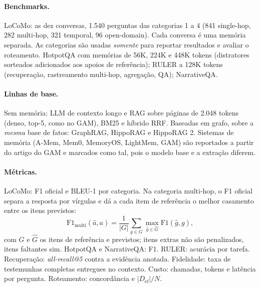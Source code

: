 \documentclass[11pt]{article}
\begin{document}
\paragraph{Benchmarks.}
LoCoMo: as dez conversas, 1.540 perguntas das categorias 1 a 4 (841
single-hop, 282 multi-hop, 321 temporal, 96 open-domain). Cada conversa é uma
memória separada. As categorias são usadas \emph{somente} para reportar
resultados e avaliar o roteamento. HotpotQA com memórias de 56K, 224K e 448K
tokens (distratores sorteados adicionados aos apoios de referência); RULER a
128K tokens (recuperação, rastreamento multi-hop, agregação, QA);
NarrativeQA.

\paragraph{Linhas de base.}
Sem memória: LLM de contexto longo e RAG sobre páginas de 2.048 tokens
(denso, top-5, como no GAM), BM25 e híbrido RRF. Baseadas em grafo, sobre a
\emph{mesma} base de fatos: GraphRAG, HippoRAG e HippoRAG 2. Sistemas de
memória (A-Mem, Mem0, MemoryOS, LightMem, GAM) são reportados a partir do
artigo do GAM e marcados como tal, pois o modelo base e a extração diferem.

\paragraph{Métricas.}
LoCoMo: F1 oficial e BLEU-1 por categoria. Na categoria multi-hop, o F1
oficial separa a resposta por vírgulas e dá a cada item de referência o melhor
casamento entre os itens previstos:
\[
\mathrm{F1}_{\text{multi}}(\hat a,a)=\frac{1}{|G|}\sum_{g\in G}\max_{\hat g\in\hat G}\mathrm{F1}(\hat g,g),
\]
com $G$ e $\hat G$ os itens de referência e previstos; itens extras não são
penalizados, itens faltantes sim. HotpotQA e NarrativeQA: F1. RULER:
acurácia por tarefa. Recuperação: \emph{all-recall@5} contra a evidência
anotada. Fidelidade: taxa de testemunhas completas entregues no contexto.
Custo: chamadas, tokens e latência por pergunta. Roteamento: concordância e
$|D_{\text{ef}}|/N$.
\end{document}
